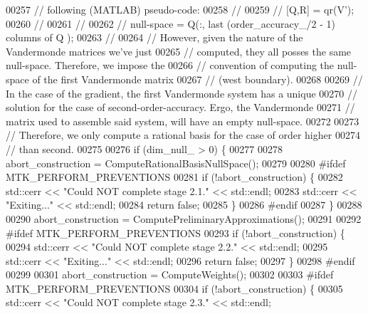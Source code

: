 \begin{DoxyCode}
00257   \textcolor{comment}{// following (MATLAB) pseudo-code:}
00258   \textcolor{comment}{//}
00259   \textcolor{comment}{// [Q,R] = qr(V'); %
00260   \textcolor{comment}{// %
00261   \textcolor{comment}{//}
00262   \textcolor{comment}{// null-space = Q(:, last (order\_accuracy\_/2 - 1) columns of Q );}
00263   \textcolor{comment}{//}
00264   \textcolor{comment}{// However, given the nature of the Vandermonde matrices we've just}
00265   \textcolor{comment}{// computed, they all posses the same null-space. Therefore, we impose the}
00266   \textcolor{comment}{// convention of computing the null-space of the first Vandermonde matrix}
00267   \textcolor{comment}{// (west boundary).}
00268 
00269   \textcolor{comment}{// In the case of the gradient, the first Vandermonde system has a unique}
00270   \textcolor{comment}{// solution for the case of second-order-accuracy. Ergo, the Vandermonde}
00271   \textcolor{comment}{// matrix used to assemble said system, will have an empty null-space.}
00272 
00273   \textcolor{comment}{// Therefore, we only compute a rational basis for the case of order higher}
00274   \textcolor{comment}{// than second.}
00275 
00276   \textcolor{keywordflow}{if} (dim\_null\_ > 0) \{
00277 
00278     abort\_construction = ComputeRationalBasisNullSpace();
00279 
00280 \textcolor{preprocessor}{    #ifdef MTK\_PERFORM\_PREVENTIONS}
00281     \textcolor{keywordflow}{if} (!abort\_construction) \{
00282       std::cerr << \textcolor{stringliteral}{"Could NOT complete stage 2.1."} << std::endl;
00283       std::cerr << \textcolor{stringliteral}{"Exiting..."} << std::endl;
00284       \textcolor{keywordflow}{return} \textcolor{keyword}{false};
00285     \}
00286 \textcolor{preprocessor}{    #endif}
00287   \}
00288 
00290   abort\_construction = ComputePreliminaryApproximations();
00291 
00292 \textcolor{preprocessor}{  #ifdef MTK\_PERFORM\_PREVENTIONS}
00293   \textcolor{keywordflow}{if} (!abort\_construction) \{
00294     std::cerr << \textcolor{stringliteral}{"Could NOT complete stage 2.2."} << std::endl;
00295     std::cerr << \textcolor{stringliteral}{"Exiting..."} << std::endl;
00296     \textcolor{keywordflow}{return} \textcolor{keyword}{false};
00297   \}
00298 \textcolor{preprocessor}{  #endif}
00299 
00301   abort\_construction = ComputeWeights();
00302 
00303 \textcolor{preprocessor}{  #ifdef MTK\_PERFORM\_PREVENTIONS}
00304   \textcolor{keywordflow}{if} (!abort\_construction) \{
00305     std::cerr << \textcolor{stringliteral}{"Could NOT complete stage 2.3."} << std::endl;
}}
\end{DoxyCode}
